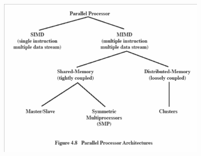 \begin{center}
            \includegraphics[width=4in]{img/classificatiemultiprocessors.png}
    \label{fig:Classificatie van multiprocessors met gedeeld geheugen}%
\end{center}


